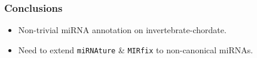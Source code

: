 \begin{frame}[t]
    \frametitle{Conclusions}
    \begin{itemize}
        \item Non-trivial miRNA annotation on invertebrate-chordate.
        \item Need to extend \texttt{miRNAture} \& \texttt{MIRfix} to non-canonical miRNAs.
    \end{itemize}
\end{frame}
